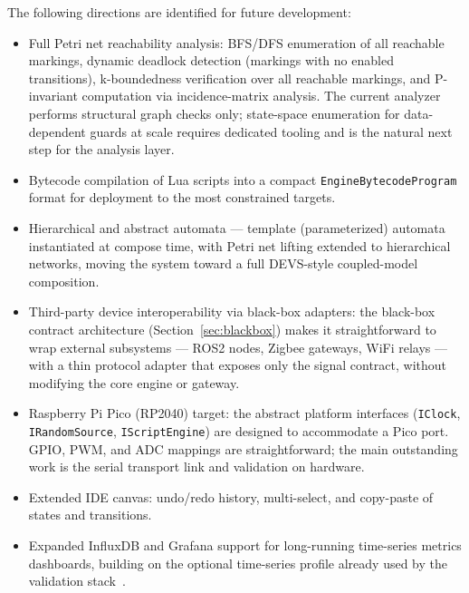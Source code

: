The following directions are identified for future development:
\begin{itemize}
  \item Full Petri net reachability analysis: BFS/DFS enumeration of all reachable markings, dynamic deadlock detection (markings with no enabled transitions), k-boundedness verification over all reachable markings, and P-invariant computation via incidence-matrix analysis. The current analyzer performs structural graph checks only; state-space enumeration for data-dependent guards at scale requires dedicated tooling and is the natural next step for the analysis layer.
  \item Bytecode compilation of Lua scripts into a compact \texttt{EngineBytecodeProgram} format for deployment to the most constrained targets.
  \item Hierarchical and abstract automata --- template (parameterized) automata instantiated at compose time, with Petri net lifting extended to hierarchical networks, moving the system toward a full DEVS-style coupled-model composition.
  \item Third-party device interoperability via black-box adapters: the black-box contract architecture (Section~\ref{sec:blackbox}) makes it straightforward to wrap external subsystems --- ROS2 nodes, Zigbee gateways, WiFi relays --- with a thin protocol adapter that exposes only the signal contract, without modifying the core engine or gateway.
  \item Raspberry Pi Pico (RP2040) target: the abstract platform interfaces (\texttt{IClock}, \texttt{IRandomSource}, \texttt{IScriptEngine}) are designed to accommodate a Pico port. GPIO, PWM, and ADC mappings are straightforward; the main outstanding work is the serial transport link and validation on hardware.
  \item Extended IDE canvas: undo/redo history, multi-select, and copy-paste of states and transitions.
  \item Expanded InfluxDB and Grafana support for long-running time-series metrics dashboards, building on the optional time-series profile already used by the validation stack~\cite{InfluxDB,GrafanaDashboards}.
\end{itemize}
